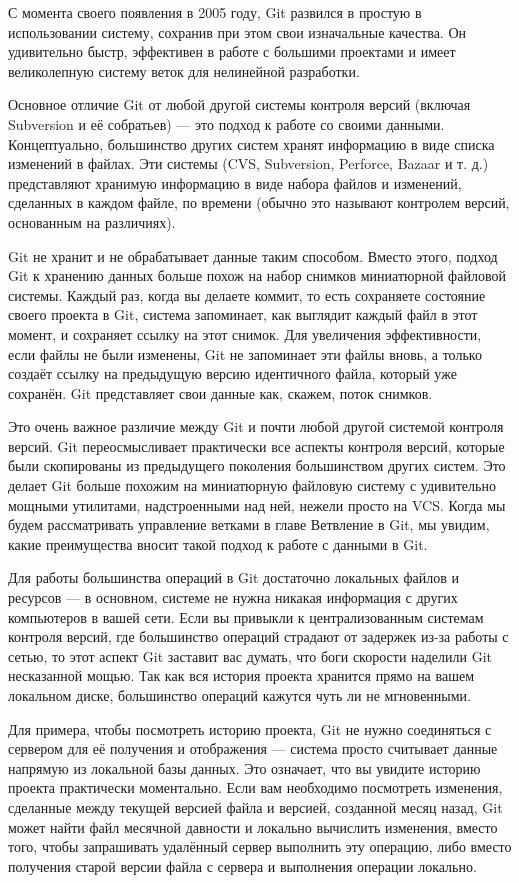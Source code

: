 С момента своего появления в 2005 году, Git развился в простую в использовании систему, сохранив при этом свои изначальные качества. Он удивительно быстр, эффективен в работе с большими проектами и имеет великолепную систему веток для нелинейной разработки.

Основное отличие Git от любой другой системы контроля версий (включая Subversion и её собратьев) — это подход к работе со своими данными. Концептуально, большинство других
систем хранят информацию в виде списка изменений в файлах. Эти системы (CVS,
Subversion, Perforce, Bazaar и т. д.) представляют хранимую информацию в виде набора файлов и изменений, сделанных в каждом файле, по времени (обычно это называют контролем версий, основанным на различиях).

Git не хранит и не обрабатывает данные таким способом. Вместо этого, подход Git к хранению данных больше похож на набор снимков миниатюрной файловой системы. Каждый раз, когда вы делаете коммит, то есть сохраняете состояние своего проекта в Git, система запоминает, как выглядит каждый файл в этот момент, и сохраняет ссылку на этот снимок. Для увеличения эффективности, если файлы не были изменены, Git не запоминает эти файлы вновь, а только создаёт ссылку на предыдущую версию идентичного файла, который уже сохранён. Git представляет свои данные как, скажем, поток снимков.

Это очень важное различие между Git и почти любой другой системой контроля версий. Git переосмысливает практически все аспекты контроля версий, которые были скопированы из предыдущего поколения большинством других систем. Это делает Git больше похожим на миниатюрную файловую систему с удивительно мощными утилитами, надстроенными над ней, нежели просто на VCS. Когда мы будем рассматривать управление ветками в главе Ветвление в Git, мы увидим, какие преимущества вносит такой подход к работе с данными в Git.

Для работы большинства операций в Git достаточно локальных файлов и ресурсов —  в основном, системе не нужна никакая информация с других компьютеров в вашей сети. Если вы привыкли к централизованным системам контроля версий, где большинство операций страдают от задержек из-за работы с сетью, то этот аспект Git заставит вас думать, что боги скорости наделили Git несказанной мощью. Так как вся история проекта хранится прямо на вашем локальном диске, большинство операций кажутся чуть ли не мгновенными.

Для примера, чтобы посмотреть историю проекта, Git не нужно соединяться с сервером для её получения и отображения — система просто считывает данные напрямую из локальной базы данных. Это означает, что вы увидите историю проекта практически моментально. Если вам необходимо посмотреть изменения, сделанные между текущей версией файла и версией, созданной месяц назад, Git может найти файл месячной давности и локально вычислить изменения, вместо того, чтобы запрашивать удалённый сервер выполнить эту операцию, либо вместо получения старой версии файла с сервера и выполнения операции локально.

